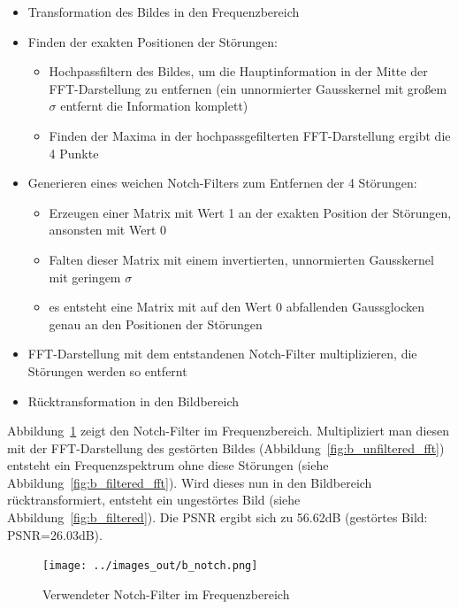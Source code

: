 \begin{itemize}
 \item Transformation des Bildes in den Frequenzbereich
 \item Finden der exakten Positionen der Störungen:
	\begin{itemize}
	 \item Hochpassfiltern des Bildes, um die Hauptinformation in der Mitte der FFT-Darstellung zu entfernen (ein unnormierter Gausskernel mit großem $\sigma$ entfernt die Information komplett)
	 \item Finden der Maxima in der hochpassgefilterten FFT-Darstellung ergibt die 4 Punkte
	\end{itemize}
 \item Generieren eines weichen Notch-Filters zum Entfernen der 4 Störungen:
  \begin{itemize}
   \item Erzeugen einer Matrix mit Wert 1 an der exakten Position der Störungen, ansonsten mit Wert 0
   \item Falten dieser Matrix mit einem invertierten, unnormierten Gausskernel mit geringem $\sigma$
   \item es entsteht eine Matrix mit auf den Wert 0 abfallenden Gaussglocken genau an den Positionen der Störungen
  \end{itemize}
 \item FFT-Darstellung mit dem entstandenen Notch-Filter multiplizieren, die Störungen werden so entfernt
 \item Rücktransformation in den Bildbereich
\end{itemize}

Abbildung~\ref{fig:b_notch} zeigt den Notch-Filter im Frequenzbereich. Multipliziert man diesen mit der FFT-Darstellung des gestörten Bildes (Abbildung~\ref{fig:b_unfiltered_fft}) entsteht ein Frequenzspektrum ohne diese Störungen (siehe Abbildung~\ref{fig:b_filtered_fft}). Wird dieses nun in den Bildbereich rücktransformiert, entsteht ein ungestörtes Bild (siehe Abbildung~\ref{fig:b_filtered}). Die PSNR ergibt sich zu 56.62dB (gestörtes Bild: PSNR=26.03dB).

\begin{figure}[htb]
 \centering
 \texttt{[image: ../images\_out/b\_notch.png]}
 \caption{Verwendeter Notch-Filter im Frequenzbereich}
 \label{fig:b_notch}
\end{figure}

